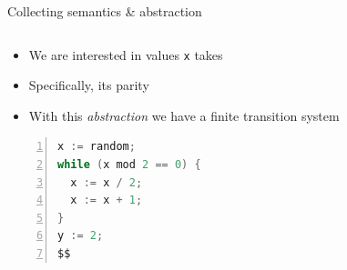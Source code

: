 \documentclass[aspectratio=169]{beamer}
\begin{document}
\begin{frame}[fragile]{Collecting semantics \& abstraction}
  \footnotesize
  \begin{columns}[T]
    \begin{column}{0.4\textwidth}
      \begin{itemize}
      \item We are interested in values \texttt{x} takes
      \item<9-> Specifically, its parity
      \item<15-> With this \emph{abstraction} we have a finite transition system
      \end{itemize}
      \begin{lstlisting}[language=Java,numbers=left,mathescape]
x := random;
while (x mod 2 == 0) {
  x := x / 2;
  x := x + 1;
}
y := 2;
$$
\end{lstlisting}
    \end{column}
    \begin{column}{0.6\textwidth}
    \end{column}
  \end{columns}
\end{frame}
\end{document}
